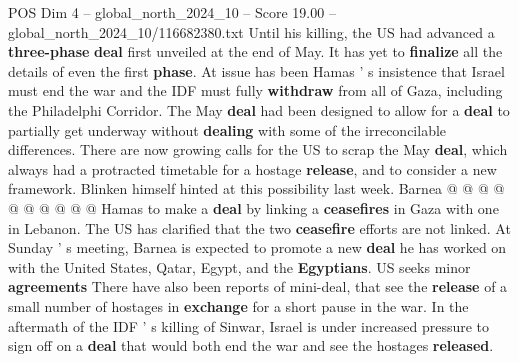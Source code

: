 \begin{textsample}{POS Dim 4 – global\_north\_2024\_10 – Score 19.00 – global\_north\_2024\_10/116682380.txt}
Until his killing, the US had advanced a \textbf{three-phase} \textbf{deal} first unveiled at the end of May.
It has yet to \textbf{finalize} all the details of even the first \textbf{phase}.
At issue has been Hamas ' s insistence that Israel must end the war and the IDF must fully \textbf{withdraw} from all of Gaza, including the Philadelphi Corridor.
The May \textbf{deal} had been designed to allow for a \textbf{deal} to partially get underway without \textbf{dealing} with some of the irreconcilable differences.
There are now growing calls for the US to scrap the May \textbf{deal}, which always had a protracted timetable for a hostage \textbf{release}, and to consider a new framework.
Blinken himself hinted at this possibility last week.
Barnea @ @ @ @ @ @ @ @ @ @ Hamas to make a \textbf{deal} by linking a \textbf{ceasefires} in Gaza with one in Lebanon.
The US has clarified that the two \textbf{ceasefire} efforts are not linked.
At Sunday ' s meeting, Barnea is expected to promote a new \textbf{deal} he has worked on with the United States, Qatar, Egypt, and the \textbf{Egyptians}.
US seeks minor \textbf{agreements} There have also been reports of mini-deal, that see the \textbf{release} of a small number of hostages in \textbf{exchange} for a short pause in the war.
In the aftermath of the IDF ' s killing of Sinwar, Israel is under increased pressure to sign off on a \textbf{deal} that would both end the war and see the hostages \textbf{released}.

\end{textsample}
